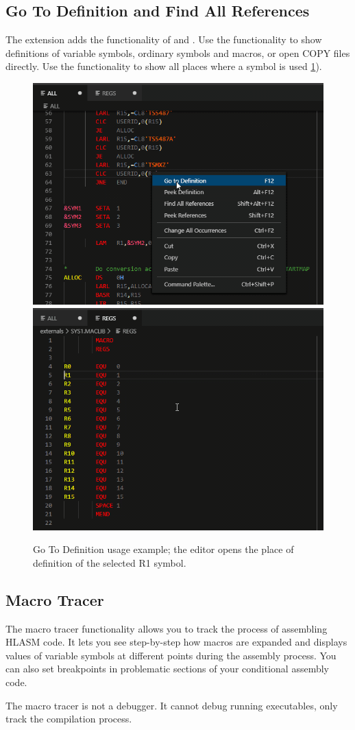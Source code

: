\subsection{Go To Definition and Find All References}
The extension adds the functionality of  and . Use the  functionality to show definitions of variable symbols, ordinary symbols and macros, or open COPY files directly. Use the  functionality to show all places where a symbol is used \cref{fig:goto}).

\begin{figure}[p]
	\centering
	\includegraphics[width=.45\linewidth]{img/go_to_def/go_to_def-54}
	\includegraphics[width=.45\linewidth]{img/go_to_def/go_to_def-56}
	\caption{Go To Definition usage example; the editor opens the place of definition of the selected R1 symbol.}
	\label{fig:goto}
\end{figure}

\subsection{Macro Tracer}
The macro tracer functionality allows you to track the process of assembling HLASM code. It lets you see step-by-step how macros are expanded and displays values of variable symbols at different points during the assembly process. You can also set breakpoints in problematic sections of your conditional assembly code. 

The macro tracer is not a debugger. It cannot debug running executables, only track the compilation process.

